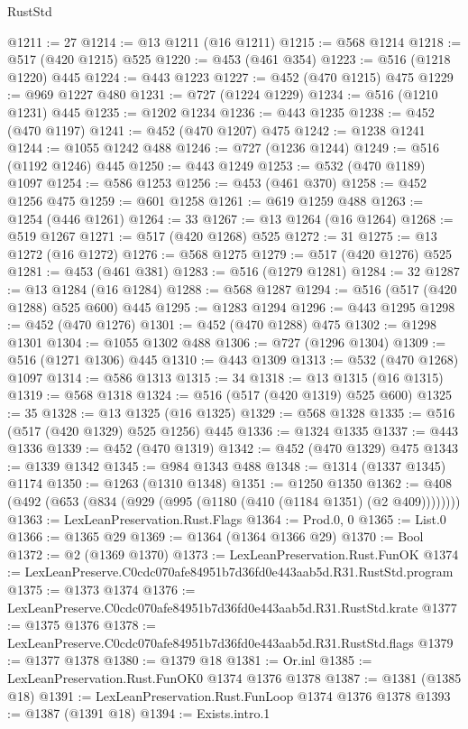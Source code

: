 \begin{lexlean}{RustStd}
\begin{coremodule}
@1211 := 27
@1214 := @13 @1211 (@16 @1211)
@1215 := @568 @1214
@1218 := @517 (@420 @1215) @525
@1220 := @453 (@461 @354)
@1223 := @516 (@1218 @1220) @445
@1224 := @443 @1223
@1227 := @452 (@470 @1215) @475
@1229 := @969 @1227 @480
@1231 := @727 (@1224 @1229)
@1234 := @516 (@1210 @1231) @445
@1235 := @1202 @1234
@1236 := @443 @1235
@1238 := @452 (@470 @1197)
@1241 := @452 (@470 @1207) @475
@1242 := @1238 @1241
@1244 := @1055 @1242 @488
@1246 := @727 (@1236 @1244)
@1249 := @516 (@1192 @1246) @445
@1250 := @443 @1249
@1253 := @532 (@470 @1189) @1097
@1254 := @586 @1253
@1256 := @453 (@461 @370)
@1258 := @452 @1256 @475
@1259 := @601 @1258
@1261 := @619 @1259 @488
@1263 := @1254 (@446 @1261)
@1264 := 33
@1267 := @13 @1264 (@16 @1264)
@1268 := @519 @1267
@1271 := @517 (@420 @1268) @525
@1272 := 31
@1275 := @13 @1272 (@16 @1272)
@1276 := @568 @1275
@1279 := @517 (@420 @1276) @525
@1281 := @453 (@461 @381)
@1283 := @516 (@1279 @1281)
@1284 := 32
@1287 := @13 @1284 (@16 @1284)
@1288 := @568 @1287
@1294 := @516 (@517 (@420 @1288) @525 @600) @445
@1295 := @1283 @1294
@1296 := @443 @1295
@1298 := @452 (@470 @1276)
@1301 := @452 (@470 @1288) @475
@1302 := @1298 @1301
@1304 := @1055 @1302 @488
@1306 := @727 (@1296 @1304)
@1309 := @516 (@1271 @1306) @445
@1310 := @443 @1309
@1313 := @532 (@470 @1268) @1097
@1314 := @586 @1313
@1315 := 34
@1318 := @13 @1315 (@16 @1315)
@1319 := @568 @1318
@1324 := @516 (@517 (@420 @1319) @525 @600)
@1325 := 35
@1328 := @13 @1325 (@16 @1325)
@1329 := @568 @1328
@1335 := @516 (@517 (@420 @1329) @525 @1256) @445
@1336 := @1324 @1335
@1337 := @443 @1336
@1339 := @452 (@470 @1319)
@1342 := @452 (@470 @1329) @475
@1343 := @1339 @1342
@1345 := @984 @1343 @488
@1348 := @1314 (@1337 @1345) @1174
@1350 := @1263 (@1310 @1348)
@1351 := @1250 @1350
@1362 := @408 (@492 (@653 (@834 (@929 (@995 (@1180 (@410 (@1184 @1351) (@2 @409))))))))
@1363 := LexLeanPreservation.Rust.Flags
@1364 := Prod.{0, 0}
@1365 := List.{0}
@1366 := @1365 @29
@1369 := @1364 (@1364 @1366 @29)
@1370 := Bool
@1372 := @2 (@1369 @1370)
@1373 := LexLeanPreservation.Rust.FunOK
@1374 := LexLeanPreserve.C0cdc070afe84951b7d36fd0e443aab5d.R31.RustStd.program
@1375 := @1373 @1374
@1376 := LexLeanPreserve.C0cdc070afe84951b7d36fd0e443aab5d.R31.RustStd.krate
@1377 := @1375 @1376
@1378 := LexLeanPreserve.C0cdc070afe84951b7d36fd0e443aab5d.R31.RustStd.flags
@1379 := @1377 @1378
@1380 := @1379 @18
@1381 := Or.inl
@1385 := LexLeanPreservation.Rust.FunOK0 @1374 @1376 @1378
@1387 := @1381 (@1385 @18)
@1391 := LexLeanPreservation.Rust.FunLoop @1374 @1376 @1378
@1393 := @1387 (@1391 @18)
@1394 := Exists.intro.{1}

\end{coremodule}
\end{lexlean}
